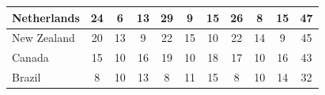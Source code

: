 \documentclass[12pt]{article}  %
\begin{document}
\begin{subappendices}
\begin{longtable}{|l|c|c|c|c|c|c|c|c|c|c|}
	\hline
	Netherlands                                                    & 24                                                                     & 6                                                                      & 13                                                                     & 29                                                                     & 9                                                                      & 15                                                                     & 26                        & 8                           & 15                          & 47                          \\ 
	\hline
	New Zealand                                                    & 20                                                                     & 13                                                                     & 9                                                                      & 22                                                                     & 15                                                                     & 10                                                                     & 22                        & 14                          & 9                           & 45                          \\ 
	\hline
	Canada                                                         & 15                                                                     & 10                                                                     & 16                                                                     & 19                                                                     & 10                                                                     & 18                                                                     & 17                        & 10                          & 16                          & 43                          \\ 
	\hline
	Brazil                                                         & 8                                                                      & 10                                                                     & 13                                                                     & 8                                                                      & 11                                                                     & 15                                                                     & 8                         & 10                          & 14                          & 32                          \\ 

\end{longtable}
\end{subappendices}
\end{document}
